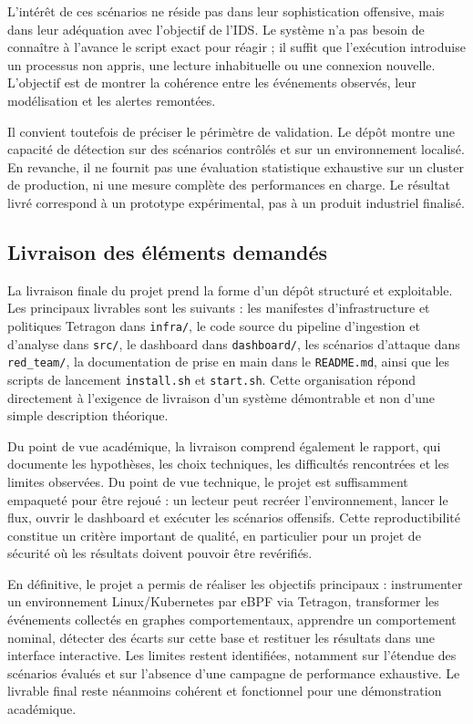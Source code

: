 \documentclass[a4paper,12pt]{article}
\begin{document}
L'intérêt de ces scénarios ne réside pas dans leur sophistication offensive, mais dans leur adéquation avec l'objectif de l'IDS. Le système n'a pas besoin de connaître à l'avance le script exact pour réagir ; il suffit que l'exécution introduise un processus non appris, une lecture inhabituelle ou une connexion nouvelle. L'objectif est de montrer la cohérence entre les événements observés, leur modélisation et les alertes remontées.

Il convient toutefois de préciser le périmètre de validation. Le dépôt montre une capacité de détection sur des scénarios contrôlés et sur un environnement localisé. En revanche, il ne fournit pas une évaluation statistique exhaustive sur un cluster de production, ni une mesure complète des performances en charge. Le résultat livré correspond à un prototype expérimental, pas à un produit industriel finalisé.

\subsection{Livraison des éléments demandés}

La livraison finale du projet prend la forme d'un dépôt structuré et exploitable. Les principaux livrables sont les suivants : les manifestes d'infrastructure et politiques Tetragon dans \texttt{infra/}, le code source du pipeline d'ingestion et d'analyse dans \texttt{src/}, le dashboard dans \texttt{dashboard/}, les scénarios d'attaque dans \texttt{red\_team/}, la documentation de prise en main dans le \texttt{README.md}, ainsi que les scripts de lancement \texttt{install.sh} et \texttt{start.sh}. Cette organisation répond directement à l'exigence de livraison d'un système démontrable et non d'une simple description théorique.

Du point de vue académique, la livraison comprend également le rapport, qui documente les hypothèses, les choix techniques, les difficultés rencontrées et les limites observées. Du point de vue technique, le projet est suffisamment empaqueté pour être rejoué : un lecteur peut recréer l'environnement, lancer le flux, ouvrir le dashboard et exécuter les scénarios offensifs. Cette reproductibilité constitue un critère important de qualité, en particulier pour un projet de sécurité où les résultats doivent pouvoir être revérifiés.

En définitive, le projet a permis de réaliser les objectifs principaux : instrumenter un environnement Linux/Kubernetes par eBPF via Tetragon, transformer les événements collectés en graphes comportementaux, apprendre un comportement nominal, détecter des écarts sur cette base et restituer les résultats dans une interface interactive. Les limites restent identifiées, notamment sur l'étendue des scénarios évalués et sur l'absence d'une campagne de performance exhaustive. Le livrable final reste néanmoins cohérent et fonctionnel pour une démonstration académique.
\end{document}
